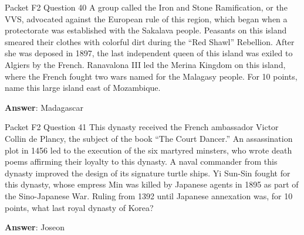 \begin{frame}{Packet F2 Question 40}
A group called the Iron and Stone Ramification, or the VVS, advocated against the European rule of this region, which began when a protectorate was established with the Sakalava people. Peasants on this island smeared their clothes with colorful dirt during the “Red Shawl” Rebellion. After she was deposed in 1897, the last independent queen of this island was exiled to Algiers by the French. Ranavalona III led the Merina     Kingdom on this island,   where the French fought two wars named for the Malagasy people. For 10 points, name this large island east of Mozambique.  

\textbf{Answer}: Madagascar\\
\end{frame}

\begin{frame}{Packet F2 Question 41}
This dynasty received the French ambassador Victor Collin de Plancy, the subject of the book ``The Court Dancer.'' An assassination plot in 1456 led to the execution of the six martyred minsters, who wrote death poems affirming their loyalty to this dynasty. A naval commander from this dynasty improved the design of its signature turtle ships. Yi Sun-Sin fought   for this dynasty, whose empress Min was   killed by Japanese agents in 1895 as part   of the Sino-Japanese War. Ruling from 1392 until Japanese   annexation was, for 10 points, what last royal dynasty of Korea?

\textbf{Answer}: Joseon\\
\end{frame}

